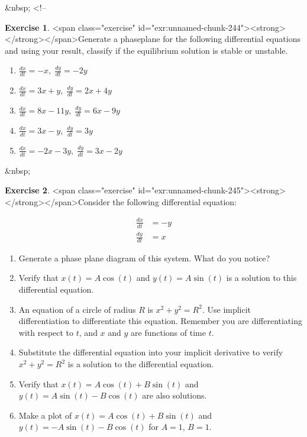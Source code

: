 \documentclass[
]{book}
\theoremstyle{definition}
\theoremstyle{definition}
\theoremstyle{definition}
\newtheorem{exercise}{Exercise}[chapter]
\theoremstyle{remark}
\begin{document}
&nbsp;
<!-- %
\begin{exercise}
<span class="exercise" id="exr:unnamed-chunk-244"><strong>\label{exr:unnamed-chunk-244} </strong></span>Generate a phaseplane for the following differential equations and using your result, classify if the equilibrium solution is stable or unstable.

\begin{enumerate}[label=\alph*.]
\item $\displaystyle \frac{dx}{dt} = -x, \;  \frac{dy}{dt} = -2y$
\item $\displaystyle \frac{dx}{dt} = 3x+y, \;  \frac{dy}{dt} = 2x+4y$
\item $\displaystyle \frac{dx}{dt} = 8x-11y, \;  \frac{dy}{dt} = 6x-9y$
\item $\displaystyle \frac{dx}{dt}= 3x-y, \; \frac{dy}{dt}=3y$
\item $\displaystyle \frac{dx}{dt} = -2x-3y, \;  \frac{dy}{dt} = 3x-2y$
\end{enumerate}
\end{exercise}

&nbsp;

\begin{exercise}
<span class="exercise" id="exr:unnamed-chunk-245"><strong>\label{exr:unnamed-chunk-245} </strong></span>Consider the following differential equation:

\begin{equation}
\begin{split}
  \frac{dx}{dt} &= -y \\ 
  \frac{dy}{dt} &= x
\end{split}
\end{equation}


\begin{enumerate}[label=\alph*.]
\item Generate a phase plane diagram of this system.  What do you notice?
\item Verify that $x(t)=A \cos(t)$ and $y(t)=A \sin(t)$ is a solution to this differential equation.
\item An equation of a circle of radius $R$ is $x^{2}+y^{2}=R^{2}$. Use implicit differentiation to differentiate this equation.  Remember you are differentiating with respect to $t$, and $x$ and $y$ are functions of time $t$.
\item Substitute the differential equation into your implicit derivative to verify $x^{2}+y^{2}=R^{2}$ is a solution to the differential equation.
\item Verify that $x(t)=A \cos(t) + B \sin(t)$ and $y(t)=A \sin(t)-B \cos(t)$ are also solutions.
\item Make a plot of $x(t)=A \cos(t) + B \sin(t)$ and $y(t)=-A \sin(t)-B \cos(t)$ for $A=1$, $B=1$.
\end{enumerate}
\end{exercise}
\end{document}
